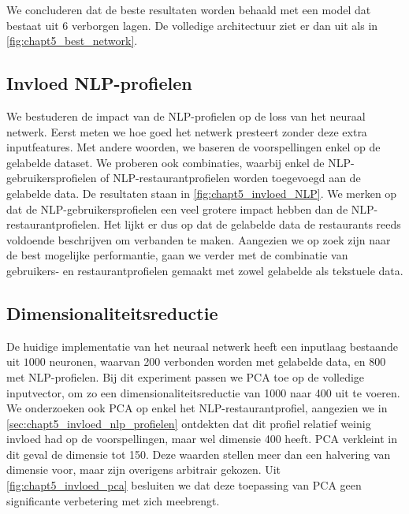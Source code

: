 We concluderen dat de beste resultaten worden behaald met een model dat bestaat uit 6 verborgen lagen. De volledige architectuur ziet er dan uit als in \autoref{fig:chapt5_best_network}.






\subsection{Invloed NLP-profielen}
\label{sec:chapt5_invloed_nlp_profielen}
We bestuderen de impact van de NLP-profielen op de loss van het neuraal netwerk. Eerst meten we hoe goed het netwerk presteert zonder deze extra inputfeatures. Met andere woorden, we baseren de voorspellingen enkel op de gelabelde dataset. We proberen ook combinaties, waarbij enkel de NLP-gebruikersprofielen of NLP-restaurantprofielen worden toegevoegd aan de gelabelde data. De resultaten staan in \autoref{fig:chapt5_invloed_NLP}. We merken op dat de NLP-gebruikersprofielen een veel grotere impact hebben dan de NLP-restaurantprofielen. Het lijkt er dus op dat de gelabelde data de restaurants reeds voldoende beschrijven om verbanden te maken. Aangezien we op zoek zijn naar de best mogelijke performantie, gaan we verder met de combinatie van gebruikers- en restaurantprofielen gemaakt met zowel gelabelde als tekstuele data.



\subsection{Dimensionaliteitsreductie}
De huidige implementatie van het neuraal netwerk heeft een inputlaag bestaande uit $1000$ neuronen, waarvan 200 verbonden worden met gelabelde data, en 800 met NLP-profielen. Bij dit experiment passen we PCA toe op de volledige inputvector, om zo een dimensionaliteitsreductie van 1000 naar 400 uit te voeren. We onderzoeken ook PCA op enkel het NLP-restaurantprofiel, aangezien we in \autoref{sec:chapt5_invloed_nlp_profielen} ontdekten dat dit profiel relatief weinig invloed had op de voorspellingen, maar wel dimensie 400 heeft. PCA verkleint in dit geval de dimensie tot 150. Deze waarden stellen meer dan een halvering van dimensie voor, maar zijn overigens arbitrair gekozen. Uit \autoref{fig:chapt5_invloed_pca} besluiten we dat deze toepassing van PCA geen significante verbetering met zich meebrengt.

